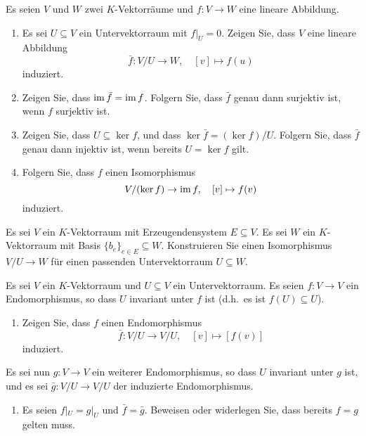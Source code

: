 \documentclass[a4paper,10pt]{scrartcl}
\begin{document}


\begin{question}
  Es seien $V$ und $W$ zwei $K$-Vektorräume und $f \colon V \to W$ eine lineare Abbildung.
  \begin{enumerate}
    \item
      Es sei $U \subseteq V$ ein Untervektorraum mit $f|_U = 0$.
      Zeigen Sie, dass $V$ eine lineare Abbildung
      \[
        \bar{f} \colon V/U \to W, \quad [v] \mapsto f(u)
      \]
      induziert.
    \item
      Zeigen Sie, dass $\operatorname{im} \bar{f} = \operatorname{im} f$.
      Folgern Sie, dass $\bar{f}$ genau dann surjektiv ist, wenn $f$ surjektiv ist.
    \item
      Zeigen Sie, dass $U \subseteq \ker f$, und dass $\ker \bar{f} = (\ker f)/U$.
      Folgern Sie, dass $\bar{f}$ genau dann injektiv ist, wenn bereits $U = \ker f$ gilt.
    \item
      Folgern Sie, dass $f$ einen Isomorphismus
      \[
        V/(\ker f) \to \operatorname{im} f,
        \quad
        [v] \mapsto f(v)
      \]
      induziert.
  \end{enumerate}
\end{question}


\begin{question}
  Es sei $V$ ein $K$-Vektorraum mit Erzeugendensystem $E \subseteq V$.
  Es sei $W$ ein $K$-Vektorraum mit Basis $\{b_e\}_{e \in E} \subseteq W$.
  Konstruieren Sie einen Isomorphismus $V/U \to W$ für einen passenden Untervektorraum $U \subseteq W$.
\end{question}


\begin{question}
  Es sei $V$ ein $K$-Vektorraum und $U \subseteq V$ ein Untervektorraum.
  Es seien $f \colon V \to V$ ein Endomorphismus, so dass $U$ invariant unter $f$ ist (d.h.\ es ist $f(U) \subseteq U$).
  \begin{enumerate}
    \item
      Zeigen Sie, dass $f$ einen Endomorphismus
      \[
        \bar{f} \colon V/U \to V/U,
        \quad
        [v] \mapsto [f(v)]
      \]
    induziert.
  \end{enumerate}
  Es sei nun $g \colon V \to V$ ein weiterer Endomorphismus, so dass $U$ invariant unter $g$ ist, und es sei $\bar{g} \colon V/U \to V/U$ der induzierte Endomorphismus.
  \begin{enumerate}[resume]
    \item
      Es seien $f|_U = g|_U$ und $\bar{f} = \bar{g}$.
      Beweisen oder widerlegen Sie, dass bereits $f = g$ gelten muss.
  \end{enumerate}
\end{question}
\end{document}
